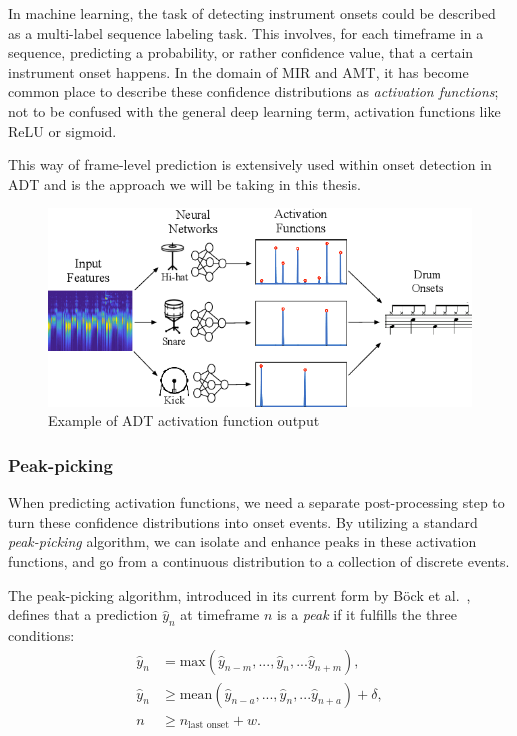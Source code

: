 In machine learning, the task of detecting instrument onsets could be described as a multi-label sequence labeling task. This involves, for each timeframe in a sequence, predicting a probability, or rather confidence value, that a certain instrument onset happens. In the domain of \gls{MIR} and \gls{AMT}, it has become common place to describe these confidence distributions as \textit{activation functions}; not to be confused with the general deep learning term, activation functions like ReLU or sigmoid.~\cite{Southall2016AutomaticDT, vogl2018multiinstrumentdrumtranscription}

This way of frame-level prediction is extensively used within onset detection in \gls{ADT} and is the approach we will be taking in this thesis.

\begin{figure}[H]
    \centering
    \includegraphics[scale=0.5]{figures/activations.png}
    \caption{Example of \gls{ADT} activation function output}
    \label{ActivationsFigure}
\end{figure}

\subsubsection{Peak-picking}

When predicting activation functions, we need a separate post-processing step to turn these confidence distributions into onset events. By utilizing a standard \textit{peak-picking} algorithm, we can isolate and enhance peaks in these activation functions, and go from a continuous distribution to a collection of discrete events.

The peak-picking algorithm, introduced in its current form by Böck et al.~\cite{Bck2012EvaluatingTO}, defines that a prediction $\hat{y}_n$ at timeframe $n$ is a \textit{peak} if it fulfills the three conditions:
\begin{align*} 
    \hat{y}_n &= \text{max}(\hat{y}_{n - m}, ..., \hat{y}_n, ... \hat{y}_{n + m}), \\ 
    \hat{y}_n &\ge \text{mean}(\hat{y}_{n - a}, ..., \hat{y}_n, ... \hat{y}_{n + a}) + \delta, \\
    n &\ge n_\text{last onset} + w.
\end{align*}


